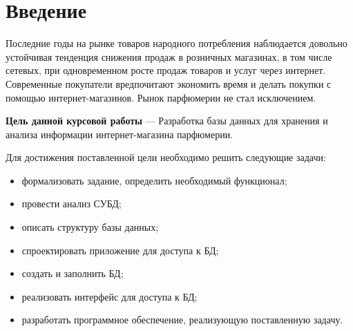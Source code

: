 \chapter*{Введение}
 
Последние годы на рынке товаров народного потребления наблюдается довольно устойчивая тенденция снижения продаж в розничных магазинах, в том числе сетевых, при одновременном росте продаж товаров и услуг через интернет. Современные покупатели вредпочитают экономить время и делать покупки с помощью интернет-магазинов. Рынок парфюмерии не стал исключением. 

\textbf{Цель данной курсовой работы} --- Разработка базы данных для хранения и анализа информации интернет-магазина парфюмерии.

Для достижения поставленной цели необходимо решить следующие задачи:
\begin{itemize}
	\item формализовать задание, определить необходимый функционал;
	\item провести анализ СУБД; 
	\item описать структуру базы данных;
	\item спроектировать приложение для доступа к БД;
	\item создать и заполнить БД;
	\item реализовать интерфейс для доступа к БД;
	\item разработать программное обеспечение, реализующую поставленную задачу.
\end{itemize}